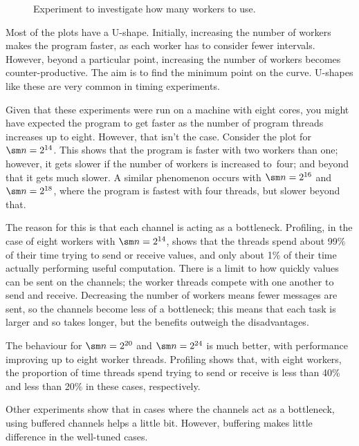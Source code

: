 
\begin{figure}
\begin{center}

\end{center}
\caption{Experiment to investigate how many workers to use.}
\label{fig:trapeziumExperimentLogScale}
\end{figure}


Most of the plots have a U-shape.  Initially, increasing the number of workers
makes the program faster, as each worker has to consider fewer intervals.
However, beyond a particular point, increasing the number of workers becomes
counter-productive.  The aim is to find the minimum point on the curve.
U-shapes like these are very common in timing experiments.

Given that these experiments were run on a machine with eight cores, you might
have expected the program to get faster as the number of program threads
increases up to eight.  However, that isn't the case.  Consider the plot for
$\sm n = 2^{14}$.  This shows that the program is faster with two workers than
one; however, it gets slower if the number of workers is increased to~four;
and beyond that it gets much slower.  A similar phenomenon occurs with $\sm n
= 2^{16}$ and $\sm n = 2^{18}$, where the program is fastest with four
threads, but slower beyond that.  

The reason for this is that each channel is acting as a bottleneck.
Profiling, in the case of eight workers with $\sm n = 2^{14}$, shows that the
threads spend about 99\% of their time trying to send or receive values, and
only about 1\% of their time actually performing useful computation.  There is
a limit to how quickly values can be sent on the channels; the worker threads
compete with one another to send and receive.  Decreasing the number of
workers means fewer messages are sent, so the channels become less of a
bottleneck; this means that each task is larger and so takes longer, but the
benefits outweigh the disadvantages.  

The behaviour for $\sm n = 2^{20}$ and $\sm n = 2^{24}$ is much better, with
performance improving up to eight worker threads.  Profiling shows that, with
eight workers, the proportion of time threads spend trying to send or receive
is less than 40\% and less than 20\% in these cases, respectively.

Other experiments show that in cases where the channels act as a bottleneck, 
using buffered channels helps a little bit.  However, buffering makes little
difference in the well-tuned cases.
 
